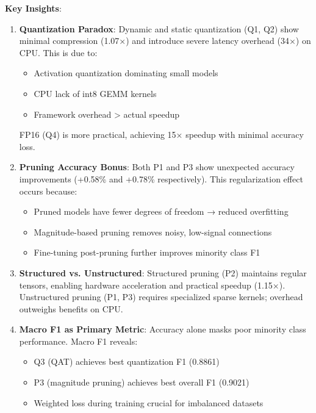 \documentclass[12pt, a4paper]{article}
\begin{document}
\textbf{Key Insights}:

\begin{enumerate}
    \item \textbf{Quantization Paradox}: Dynamic and static quantization (Q1, Q2) show minimal compression (1.07×) and introduce severe latency overhead (34×) on CPU. This is due to:
    \begin{itemize}
        \item Activation quantization dominating small models
        \item CPU lack of int8 GEMM kernels
        \item Framework overhead > actual speedup
    \end{itemize}
    FP16 (Q4) is more practical, achieving 15× speedup with minimal accuracy loss.

    \item \textbf{Pruning Accuracy Bonus}: Both P1 and P3 show unexpected accuracy improvements (+0.58\% and +0.78\% respectively). This regularization effect occurs because:
    \begin{itemize}
        \item Pruned models have fewer degrees of freedom → reduced overfitting
        \item Magnitude-based pruning removes noisy, low-signal connections
        \item Fine-tuning post-pruning further improves minority class F1
    \end{itemize}

    \item \textbf{Structured vs. Unstructured}: Structured pruning (P2) maintains regular tensors, enabling hardware acceleration and practical speedup (1.15×). Unstructured pruning (P1, P3) requires specialized sparse kernels; overhead outweighs benefits on CPU.

    \item \textbf{Macro F1 as Primary Metric}: Accuracy alone masks poor minority class performance. Macro F1 reveals:
    \begin{itemize}
        \item Q3 (QAT) achieves best quantization F1 (0.8861)
        \item P3 (magnitude pruning) achieves best overall F1 (0.9021)
        \item Weighted loss during training crucial for imbalanced datasets
    \end{itemize}
\end{enumerate}
\end{document}
